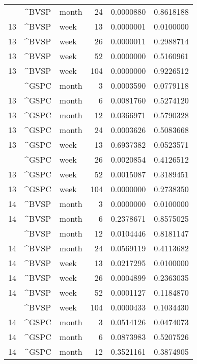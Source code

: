 \begin{tabular}{rllrrr}
\addlinespace
13 & \textasciicircum{}BVSP & month & 24 & 0.0000880 & 0.8618188\\
13 & \textasciicircum{}BVSP & week & 13 & 0.0000001 & 0.0100000\\
13 & \textasciicircum{}BVSP & week & 26 & 0.0000011 & 0.2988714\\
13 & \textasciicircum{}BVSP & week & 52 & 0.0000000 & 0.5160961\\
13 & \textasciicircum{}BVSP & week & 104 & 0.0000000 & 0.9226512\\
\addlinespace
13 & \textasciicircum{}GSPC & month & 3 & 0.0003590 & 0.0779118\\
13 & \textasciicircum{}GSPC & month & 6 & 0.0081760 & 0.5274120\\
13 & \textasciicircum{}GSPC & month & 12 & 0.0366971 & 0.5790328\\
13 & \textasciicircum{}GSPC & month & 24 & 0.0003626 & 0.5083668\\
13 & \textasciicircum{}GSPC & week & 13 & 0.6937382 & 0.0523571\\
\addlinespace
13 & \textasciicircum{}GSPC & week & 26 & 0.0020854 & 0.4126512\\
13 & \textasciicircum{}GSPC & week & 52 & 0.0015087 & 0.3189451\\
13 & \textasciicircum{}GSPC & week & 104 & 0.0000000 & 0.2738350\\
14 & \textasciicircum{}BVSP & month & 3 & 0.0000000 & 0.0100000\\
14 & \textasciicircum{}BVSP & month & 6 & 0.2378671 & 0.8575025\\
\addlinespace
14 & \textasciicircum{}BVSP & month & 12 & 0.0104446 & 0.8181147\\
14 & \textasciicircum{}BVSP & month & 24 & 0.0569119 & 0.4113682\\
14 & \textasciicircum{}BVSP & week & 13 & 0.0217295 & 0.0100000\\
14 & \textasciicircum{}BVSP & week & 26 & 0.0004899 & 0.2363035\\
14 & \textasciicircum{}BVSP & week & 52 & 0.0001127 & 0.1184870\\
\addlinespace
14 & \textasciicircum{}BVSP & week & 104 & 0.0000433 & 0.1034430\\
14 & \textasciicircum{}GSPC & month & 3 & 0.0514126 & 0.0474073\\
14 & \textasciicircum{}GSPC & month & 6 & 0.0873983 & 0.5207526\\
14 & \textasciicircum{}GSPC & month & 12 & 0.3521161 & 0.3874905\\

\end{tabular}
